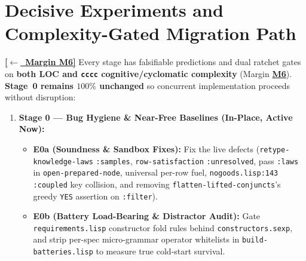 \documentclass[12pt]{article}
\newcommand{\ansback}[2]{\hyperlink{#1}{\textcolor{qpurple}{\textbf{\small[\(\leftarrow\)~#2]}}}}
\begin{document}
\section{Decisive Experiments and Complexity-Gated Migration Path}
\label{sec:experiments}

\ansback{q:m6}{Margin M6}
Every stage has falsifiable predictions and dual ratchet gates on \textbf{both LOC and \texttt{cccc} cognitive/cyclomatic complexity} (Margin \hyperlink{q:m6}{\textbf{M6}}). \textbf{Stage~0 remains $100\%$ unchanged} so concurrent implementation proceeds without disruption:

\begin{enumerate}[leftmargin=1.6em, itemsep=0.25em]
  \item \textbf{Stage 0 --- Bug Hygiene \& Near-Free Baselines (In-Place, Active Now):}
  \begin{itemize}[leftmargin=1.4em, itemsep=0.1em]
    \item \textbf{E0a (Soundness \& Sandbox Fixes):} Fix the live defects (\texttt{retype-knowledge-laws} \texttt{:samples}, \texttt{row-satisfaction} \texttt{:unresolved}, pass \texttt{:laws} in \texttt{open-prepared-node}, universal per-row fuel, \texttt{nogoods.lisp:143} \texttt{:coupled} key collision, and removing \texttt{flatten-lifted-conjuncts}'s greedy \texttt{YES} assertion on \texttt{:filter}).
    \item \textbf{E0b (Battery Load-Bearing \& Distractor Audit):} Gate \texttt{requirements.lisp} constructor fold rules behind \texttt{constructors.sexp}, and strip per-spec micro-grammar operator whitelists in \texttt{build-batteries.lisp} to measure true cold-start survival.
  \end{itemize}


\end{enumerate}
\end{document}
